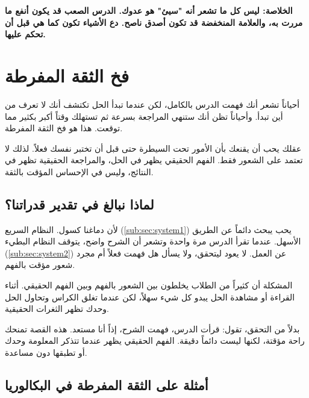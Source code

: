 \documentclass[12pt,a4paper]{book}
\newcommand{\importantAr}[1]{%
	\begin{important}
		\bfseries #1
	\end{important}
}
\begin{document}
	\importantAr{الخلاصة: ليس كل ما تشعر أنه "سيئ" هو عدوك. الدرس الصعب قد يكون أنفع ما مررت به، والعلامة المنخفضة قد تكون أصدق ناصح. دع الأشياء تكون كما هي قبل أن تحكم عليها.}
	
	\section{فخ الثقة المفرطة}
	\label{sec:overconfidence}
	
	أحياناً تشعر أنك فهمت الدرس بالكامل، لكن عندما تبدأ الحل تكتشف أنك لا تعرف من أين تبدأ. وأحياناً تظن أنك ستنهي المراجعة بسرعة ثم تستهلك وقتاً أكبر بكثير مما توقعت. هذا هو فخ الثقة المفرطة.
	
	عقلك يحب أن يقنعك بأن الأمور تحت السيطرة حتى قبل أن تختبر نفسك فعلاً. لذلك لا تعتمد على الشعور فقط. الفهم الحقيقي يظهر في الحل، والمراجعة الحقيقية تظهر في النتائج، وليس في الإحساس المؤقت بالثقة.
	\subsection{لماذا نبالغ في تقدير قدراتنا؟}
	
	لأن دماغنا كسول. النظام السريع (\ref{sub:sec:system1}) يحب يبحث دائماً عن الطريق الأسهل. عندما تقرأ الدرس مرة واحدة وتشعر أن الشرح واضح، يتوقف النظام البطيء (\ref{sub:sec:system2}) عن العمل. لا يعود ليتحقق، ولا يسأل هل فهمت فعلاً أم مجرد شعور مؤقت بالفهم.
	
	المشكلة أن كثيراً من الطلاب يخلطون بين الشعور بالفهم وبين الفهم الحقيقي. أثناء القراءة أو مشاهدة الحل يبدو كل شيء سهلاً، لكن عندما تغلق الكراس وتحاول الحل وحدك تظهر الثغرات الحقيقية.
	
	بدلاً من التحقق، تقول: قرأت الدرس، فهمت الشرح، إذاً أنا مستعد. هذه القصة تمنحك راحة مؤقتة، لكنها ليست دائماً دقيقة. الفهم الحقيقي يظهر عندما تتذكر المعلومة وحدك أو تطبقها دون مساعدة.
	
	\subsection{أمثلة على الثقة المفرطة في البكالوريا}
	
\end{document}
